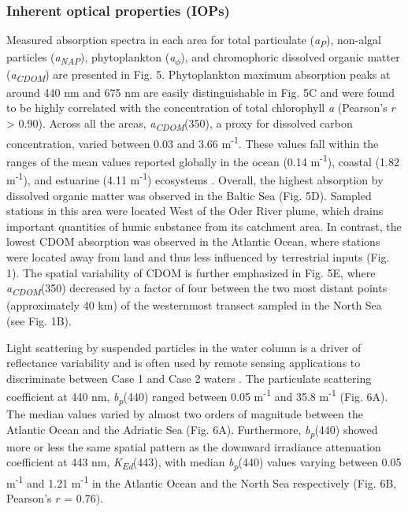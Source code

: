 \documentclass[essd, manuscript]{copernicus}
\begin{document}
\subsubsection{Inherent optical properties (IOPs)}

Measured absorption spectra in each area for total particulate (\textit{a\textsubscript{P}}), non-algal particles (\textit{a\textsubscript{NAP}}), phytoplankton (\textit{a\textsubscript{$\phi$}}), and chromophoric dissolved organic matter (\textit{a\textsubscript{CDOM}}) are presented in Fig. 5. Phytoplankton maximum absorption peaks at around 440 nm and 675 nm are easily distinguishable in Fig. 5C and were found to be highly correlated with the concentration of total chlorophyll \textit{a} (Pearson's $r$ > 0.90). Across all the areas, \textit{a\textsubscript{CDOM}}(350), a proxy for dissolved carbon concentration, varied between 0.03 and 3.66 m\textsuperscript{-1}. These values fall within the ranges of the mean values reported globally in the ocean (0.14 m\textsuperscript{-1}), coastal (1.82 m\textsuperscript{-1}), and estuarine (4.11 m\textsuperscript{-1}) ecosystems \citep{Massicotte2017}. Overall, the highest absorption by dissolved organic matter was observed in the Baltic Sea (Fig. 5D). Sampled stations in this area were located West of the Oder River plume, which drains important quantities of humic substance from its catchment area. In contrast, the lowest CDOM absorption was observed in the Atlantic Ocean, where stations were located away from land and thus less influenced by terrestrial inputs (Fig. 1). The spatial variability of CDOM is further emphasized in Fig. 5E, where \textit{a\textsubscript{CDOM}}(350) decreased by a factor of four between the two most distant points (approximately 40 km) of the westernmost transect sampled in the North Sea (see Fig. 1B).

Light scattering by suspended particles in the water column is a driver of reflectance variability and is often used by remote sensing applications to discriminate between Case 1 and Case 2 waters \citep{ioccg2000, Morel2006}. The particulate scattering coefficient at 440 nm, \textit{b\textsubscript{p}}(440) ranged between 0.05 m\textsuperscript{-1} and 35.8 m\textsuperscript{-1} (Fig. 6A). The median values varied by almost two orders of magnitude between the Atlantic Ocean and the Adriatic Sea (Fig. 6A). Furthermore, \textit{b\textsubscript{p}}(440) showed more or less the same spatial pattern as the downward irradiance attenuation coefficient at 443 nm, \textit{K\textsubscript{Ed}}(443), with median \textit{b\textsubscript{p}}(440) values varying between 0.05 m\textsuperscript{-1} and 1.21 m\textsuperscript{-1} in the Atlantic Ocean and the North Sea respectively (Fig. 6B, Pearson's $r$ = 0.76).
\end{document}
